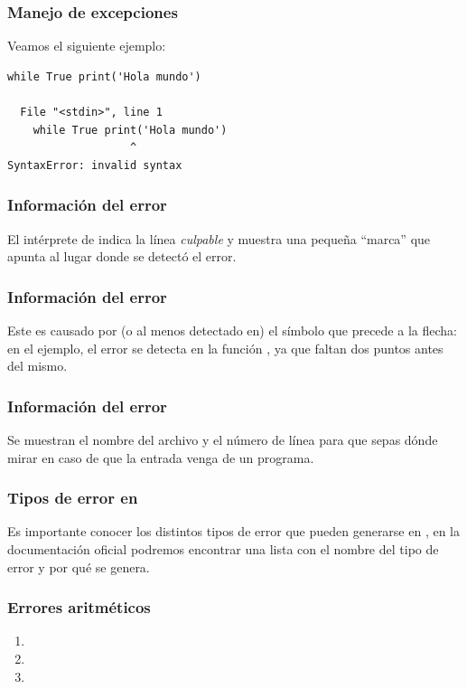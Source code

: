 \documentclass[12pt]{beamer}
\begin{document}
\begin{frame}[fragile]
\frametitle{Manejo de excepciones}
Veamos el siguiente ejemplo:
\begin{lstlisting}
while True print('Hola mundo')

  File "<stdin>", line 1
    while True print('Hola mundo')
                   ^
SyntaxError: invalid syntax
\end{lstlisting}
\end{frame}
\begin{frame}
\frametitle{Información del error}
El intérprete de \python{} indica la línea \emph{culpable} y muestra una pequeña \enquote{marca} que apunta al lugar donde se detectó el error.
\end{frame}
\begin{frame}
\frametitle{Información del error}
Este es causado por (o al menos detectado en) el símbolo que precede a la flecha: en el ejemplo, el error se detecta en la función , ya que faltan dos puntos \azulfuerte{(:)} antes del mismo.
\end{frame}
\begin{frame}
\frametitle{Información del error}
Se muestran el nombre del archivo y el número de línea para que sepas dónde mirar en caso de que la entrada venga de un programa.    
\end{frame}
\begin{frame}
\frametitle{Tipos de error en \python}
Es importante conocer los distintos tipos de error que pueden generarse en \python, en la documentación oficial podremos encontrar una lista con el nombre del tipo de error y por qué se genera.
\end{frame}
\begin{frame}
\frametitle{Errores aritméticos}
\begin{enumerate}[<+->]
\item {}
\item {}
\item {}
\end{enumerate}
\end{frame}
\end{document}

